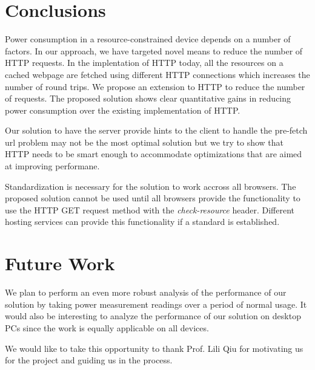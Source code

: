 \documentclass{sigplanconf}
\begin{document}
\section{Conclusions}

Power consumption in a resource-constrained device depends on a number of factors. In our approach, we have targeted novel means to reduce the number of HTTP requests. In the implentation of HTTP today, all the resources on a cached webpage are fetched using different HTTP connections which increases the number of round trips. We propose an extension to HTTP to reduce the number of requests. The proposed solution shows clear quantitative gains in reducing power consumption over the existing implementation of HTTP. 

Our solution to have the server provide hints to the client to handle the pre-fetch url problem may not be the most optimal solution but we try to show that HTTP needs to be smart enough 	to accommodate optimizations that are aimed at improving performane.

Standardization is necessary for the solution to work accross all browsers. The proposed solution cannot be used until all browsers provide the functionality to use the HTTP GET request method with the {\it check-resource} header. Different hosting services can provide this functionality if a standard is established.

\section{Future Work}

We plan to perform an even more robust analysis of the performance of our solution by taking power measurement readings over a period of normal usage. It would also be interesting to analyze the performance of our solution on desktop PCs since the work is equally applicable on all devices. 

\acks

We would like to take this opportunity to thank Prof. Lili Qiu for motivating us for the project and guiding us in the process.


\end{document}
